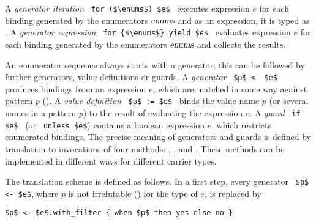 A {\em generator iteration} ~\lstinline!for ($\enums$) $e$!~ executes expression $e$ for each binding generated by the enumerators $\mbox{\sl enums}$ and as an expression, it is typed as . A {\em generator expression} ~\lstinline!for {$\enums$} yield $e$!~ evaluates expression $e$ for each binding generated by the enumerators $\mbox{\sl enums}$ and collects the results.

An enumerator sequence always starts with a generator; this can be followed by further generators, value definitions or guards. A {\em generator} ~\lstinline!$p$ <- $e$!~ produces bindings from an expression $e$, which are matched in some way against pattern $p$ (). A {\em value definition} ~\lstinline!$p$ := $e$!~ binds the value name $p$ (or several names in a pattern $p$) to the result of evaluating the expression $e$. A {\em guard} ~\lstinline!if $e$!~ (or ~\lstinline!unless $e$!) contains a boolean expression $e$, which restricts enumerated bindings. The precise meaning of generators and guards is defined by translation to invocations of four methods: , ,  and . These methods can be implemented in different ways for different carrier types.

The translation scheme is defined as follows. In a first step, every generator ~\lstinline!$p$ <- $e$!, where $p$ is not irrefutable () for the type of $e$, is replaced by 
\begin{lstlisting}
$p$ <- $e$.with_filter { when $p$ then yes else no }
\end{lstlisting}


